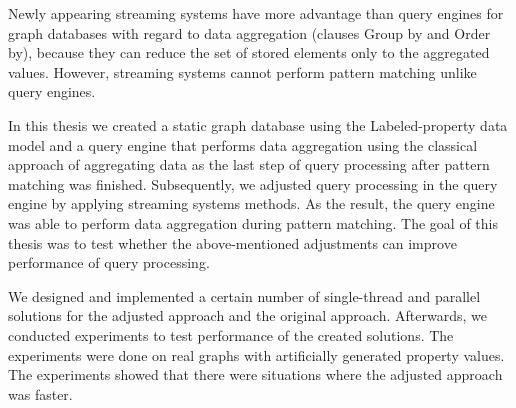\documentclass[12pt]{report}
\begin{document}

Newly appearing streaming systems have more advantage than query engines for graph databases with regard to data aggregation (clauses Group by and Order by), because they can reduce the set of stored elements only to the aggregated values.
However, streaming systems cannot perform pattern matching unlike query engines.

In this thesis we created a static graph database using the Labeled-property data model and a query engine that performs data aggregation using the classical approach of aggregating data as the last step of query processing after pattern matching was finished.
Subsequently, we adjusted query processing in the query engine by applying streaming systems methods. 
As the result, the query engine was able to perform data aggregation during pattern matching.  
The goal of this thesis was to test whether the above-mentioned adjustments can improve performance of query processing.

We designed and implemented a certain number of single-thread and parallel solutions for the adjusted approach and the original approach.
Afterwards, we conducted experiments to test performance of the created solutions.
The experiments were done on real graphs with artificially generated property values.
The experiments showed that there were situations where the adjusted approach was faster. 
\end{document}
